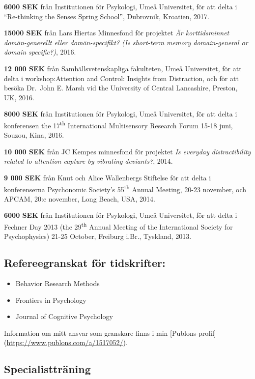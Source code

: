 \documentclass[]{article}
\begin{document}
\textbf{6000 SEK} från Institutionen för Psykologi, Umeå Universitet,
för att delta i ``Re-thinking the Senses Spring School'', Dubrovnik,
Kroatien, 2017.

\textbf{15000 SEK} från Lars Hiertas Minnesfond för projektet \emph{Är
korttidsminnet domän-generellt eller domän-specifikt? (Is short-term
memory domain-general or domain specific?)}, 2016.

\textbf{12 000 SEK} från Samhällsvetenskapliga fakulteten, Umeå
Universitet, för att delta i workshop:Attention and Control: Insights
from Distraction, och för att besöka Dr.~John E. Marsh vid the
University of Central Lancashire, Preston, UK, 2016.

\textbf{8000 SEK} från Institutionen för Psykologi, Umeå Universitet,
för att delta i konferensen the 17\textsuperscript{th} International
Multisensory Research Forum 15-18 juni, Souzou, Kina, 2016.

\textbf{10 000 SEK} från JC Kempes minnesfond för projektet \emph{Is
everyday distractibility related to attention capture by vibrating
deviants?}, 2014.

\textbf{9 000 SEK} från Knut och Alice Wallenbergs Stiftelse för att
delta i konferenserna Psychonomic Society's 55\textsuperscript{th}
Annual Meeting, 20-23 november, och APCAM, 20:e november, Long Beach,
USA, 2014.

\textbf{6000 SEK} från Institutionen för Psykologi, Umeå Universitet,
för att delta i Fechner Day 2013 (the 29\textsuperscript{th} Annual
Meeting of the International Society for Psychophysics) 21-25 October,
Freiburg i.Br., Tyskland, 2013.

\hypertarget{refereegranskat-fuxf6r-tidskrifter}{%
\subsection{Refereegranskat för
tidskrifter:}\label{refereegranskat-fuxf6r-tidskrifter}}

\begin{itemize}
\item
  Behavior Research Methods
\item
  Frontiers in Psychology
\item
  Journal of Cognitive Psychology
\end{itemize}

Information om mitt ansvar som granskare finns i min
{[}Publons-profil{]} (\url{https://www.publons.com/a/1517052/}).

\hypertarget{specialisttruxe4ning}{%
\subsection{Specialistträning}\label{specialisttruxe4ning}}
\end{document}
